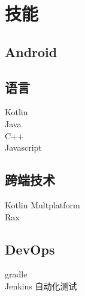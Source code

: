 \documentclass[]{deedy-resume-openfont}
\begin{document}
\begin{minipage}[t]{0.25\textwidth}

\sectionsep
\section{技能}
\sectionsep
\subsection{Android}
\sectionsep
{}
\sectionsep
\subsection{语言}
\sectionsep
Kotlin \textbullet{} \\
Java \textbullet{} \\ 
C++ \textbullet{} \\
Javascript \\
\sectionsep

\subsection{跨端技术}
\sectionsep
Kotlin Multplatform \textbullet{} \\
Rax \\
\sectionsep

\subsection{DevOps}
\sectionsep
gradle \\
Jenkins \textbullet{} 自动化测试

%
%

\end{minipage} 
\hfill
\end{document}
